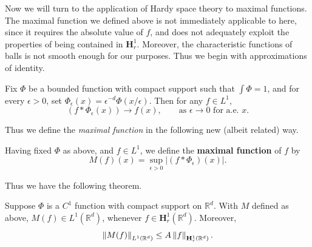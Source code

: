 \documentclass{article}
\begin{document}
Now we will turn to the application of Hardy space theory to maximal functions. The maximal function we defined above is not immediately applicable to here, since it requires the absolute value of $f$, and does not adequately exploit the properties of being contained in $\textbf{H}^{1}_{r}$. Moreover, the characteristic functions of balls is not smooth enough for our purposes. Thus we begin with approximations of identity. 

\begin{lemma}
	Fix $\Phi$ be a bounded function with compact support such that $\int \Phi = 1$, and for every $\epsilon > 0$, set $\Phi_{\epsilon}(x) = \epsilon^{-d}\Phi(x/\epsilon)$. Then for any $f \in L^{1}$, $$(f \ast \Phi_{\epsilon}(x)) \to f(x), \qquad \text{as $\epsilon \to 0$ for a.e. $x$}.$$ 
\end{lemma} 
Thus we define the \textit{maximal function} in the following new (albeit related) way. 
\begin{definition}
	Having fixed $\Phi$ as above, and $f \in L^{1}$, we define the \textbf{maximal function} of $f$ by 
	\begin{equation*}
		M(f)(x) = \sup_{\epsilon > 0}|(f \ast \Phi_{\epsilon})(x)|. 
	\end{equation*} 
\end{definition}
Thus we have the following theorem. 
\begin{theorem}
	Suppose $\Phi$ is a $C^{1}$ function with compact support on $\mathbb{R}^{d}$. With $M$ defined as above, $M(f) \in L^{1}(\mathbb{R}^{d})$, whenever $f \in \mathbf{H}^{1}_{r}(\mathbb{R}^{d})$. Moreover, 
	\begin{equation*}
		\left\Vert M(f) \right\Vert_{L^{1}(\mathbb{R}^{d})} \leq A\left\Vert f \right\Vert_{\mathbf{H}^{1}_{r}(\mathbb{R}^{d})}. 
	\end{equation*}
\end{theorem} 
\end{document}
